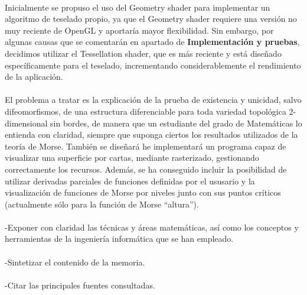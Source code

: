 \\Inicialmente se propuso el uso del Geometry shader para implementar un algoritmo de teselado propio, ya que el Geometry shader requiere una versión no muy reciente de OpenGL y aportaría mayor flexibilidad. Sin embargo, por algunas causas que se comentarán en apartado de \textbf{Implementación y pruebas}, decidimos utilizar el Tessellation shader, que es más reciente y está diseñado específicamente para el teselado, incrementando considerablemente el rendimiento de la aplicación.\\
\\El problema a tratar es la explicación de la prueba de existencia y unicidad, salvo difeomorfismos, de una estructura diferenciable para toda variedad topológica 2-dimensional sin bordes, de manera que un estudiante del grado de Matemáticas lo entienda con claridad, siempre que suponga ciertos los resultados utilizados de la teoría de Morse. También se diseñará he implementará un programa capaz de visualizar una superficie por cartas, mediante rasterizado, gestionando correctamente los recursos. Además, se ha conseguido incluir la posibilidad de utilizar derivadas parciales de funciones definidas por el ususario y la visualización de funciones de Morse por niveles junto con sus puntos críticos (actualmente sólo para la función de Morse ``altura'').\\
\\-Exponer con claridad las técnicas y áreas matemáticas, así como los conceptos y herramientas de la ingeniería informática que se han empleado.\\
\\-Sintetizar el contenido de la memoria.\\
\\-Citar las principales fuentes consultadas.\\

\endinput
